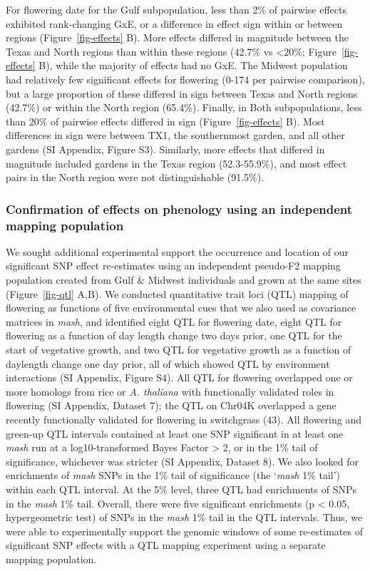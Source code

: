\documentclass[
  9pt,
  twocolumn,
  twoside]{pnas-new}
\begin{document}
For flowering date for the Gulf subpopulation, less than 2\% of pairwise
effects exhibited rank-changing GxE, or a difference in effect sign
within or between regions (Figure~\ref{fig-effects} B). More effects
differed in magnitude between the Texas and North regions than within
these regions (42.7\% vs \textless20\%; Figure~\ref{fig-effects} B),
while the majority of effects had no GxE. The Midwest population had
relatively few significant effects for flowering (0-174 per pairwise
comparison), but a large proportion of these differed in sign between
Texas and North regions (42.7\%) or within the North region (65.4\%).
Finally, in Both subpopulations, less than 20\% of pairwise effects
differed in sign (Figure~\ref{fig-effects} B). Most differences in sign
were between TX1, the southernmost garden, and all other gardens (SI
Appendix, Figure S3). Similarly, more effects that differed in magnitude
included gardens in the Texas region (52.3-55.9\%), and most effect
pairs in the North region were not distinguishable (91.5\%).

\subsubsection{Confirmation of effects on phenology using an independent
mapping
population}\label{confirmation-of-effects-on-phenology-using-an-independent-mapping-population}

We sought additional experimental support the occurrence and location of
our significant SNP effect re-estimates using an independent pseudo-F2
mapping population created from Gulf \& Midwest individuals and grown at
the same sites (Figure~\ref{fig-qtl} A,B). We conducted quantitative
trait loci (QTL) mapping of flowering as functions of five environmental
cues that we also used as covariance matrices in \emph{mash}, and
identified eight QTL for flowering date, eight QTL for flowering as a
function of day length change two days prior, one QTL for the start of
vegetative growth, and two QTL for vegetative growth as a function of
daylength change one day prior, all of which showed QTL by environment
interactions (SI Appendix, Figure S4). All QTL for flowering overlapped
one or more homologs from rice or \emph{A. thaliana} with functionally
validated roles in flowering (SI Appendix, Dataset 7); the QTL on Chr04K
overlapped a gene recently functionally validated for flowering in
switchgrass (43). All flowering and green-up QTL intervals contained at
least one SNP significant in at least one \emph{mash} run at a
log10-transformed Bayes Factor \textgreater{} 2, or in the 1\% tail of
significance, whichever was stricter (SI Appendix, Dataset 8). We also
looked for enrichments of \emph{mash} SNPs in the 1\% tail of
significance (the `\emph{mash} 1\% tail') within each QTL interval. At
the 5\% level, three QTL had enrichments of SNPs in the \emph{mash} 1\%
tail. Overall, there were five significant enrichments (p \textless{}
0.05, hypergeometric test) of SNPs in the \emph{mash} 1\% tail in the
QTL intervals. Thus, we were able to experimentally support the genomic
windows of some re-estimates of significant SNP effects with a QTL
mapping experiment using a separate mapping population.
\end{document}
